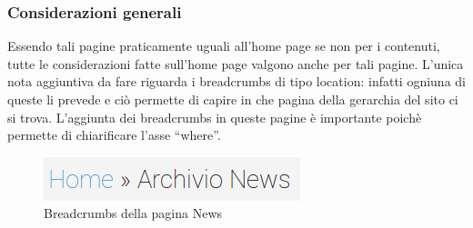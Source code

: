 \documentclass[../ProgettoTecWeb2.tex]{subfiles}
\begin{document}
		\subsubsection{Considerazioni generali}
		Essendo tali pagine praticamente uguali all'home page se non per i contenuti, tutte le considerazioni fatte sull'home page valgono anche per tali pagine. L'unica nota aggiuntiva da fare riguarda i breadcrumbs di tipo location: infatti ogniuna di queste li prevede e ciò permette di capire in che pagina della gerarchia del sito ci si trova. L'aggiunta dei breadcrumbs in queste pagine è importante poichè permette di chiarificare l'asse ``where''.
		\begin{figure} [H]
				\centering
				\includegraphics[scale=0.6]{img/BreadcrumbsNews}
				\caption{Breadcrumbs della pagina News}
		\end{figure}

	\newpage
\end{document}
